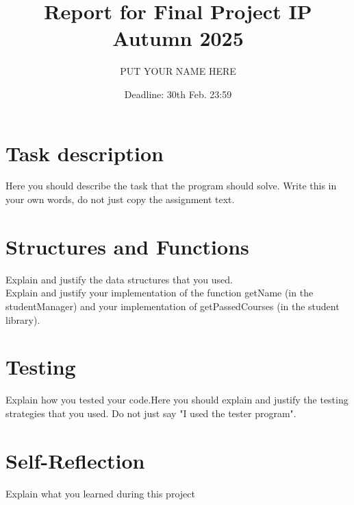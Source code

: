 \documentclass[a4paper,11pt]{article}
\title{Report for Final Project IP Autumn 2025}
\date{Deadline: 30th Feb.  23:59}
\author{PUT YOUR NAME HERE}
\begin{document}
\maketitle

\section*{Task description}

Here you should describe the task that the program should solve.
Write this in your own words, do not just copy the assignment text.

\section*{Structures and Functions}

Explain and justify the data structures that you used. \\

Explain and justify your implementation of the function getName (in the studentManager) and your implementation of getPassedCourses (in the student library).

\section*{Testing}

Explain how you tested your code.Here you should explain and justify the testing strategies that you used. Do not just say "I used the tester program". 

\section*{Self-Reflection}

Explain what you learned during this project
\end{document}
